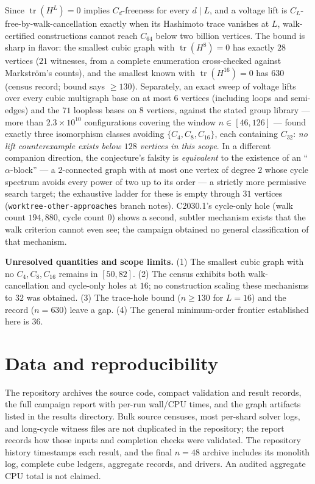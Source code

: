 \documentclass[11pt]{article}
\theoremstyle{remark}
\newcommand{\Cyc}[1]{C_{#1}}
\begin{document}
Since $\operatorname{tr}(H^L) = 0$ implies $\Cyc d$-freeness for every
$d \mid L$, and a voltage lift is $\Cyc L$-free-by-walk-cancellation exactly
when its Hashimoto trace vanishes at $L$, walk-certified constructions
cannot reach $\Cyc{64}$ below two billion vertices. The bound is sharp in
flavor: the smallest cubic graph with $\operatorname{tr}(H^8)=0$ has exactly
$28$ vertices ($21$ witnesses, from a complete enumeration cross-checked
against Markstr\"om's counts), and the smallest known with
$\operatorname{tr}(H^{16})=0$ has $630$ (census record; bound says
$\ge 130$). Separately, an exact sweep of voltage lifts over every cubic
multigraph base on at most $6$ vertices (including loops and semi-edges) and
the $71$ loopless bases on $8$ vertices, against the stated group library ---
more than $2.3\times10^{10}$ configurations covering the window
$n \in [46,126]$ ---
found exactly three isomorphism classes avoiding
$\{\Cyc4,\Cyc8,\Cyc{16}\}$, each containing $\Cyc{32}$: \emph{no lift
counterexample exists below $128$ vertices in this scope}. In a different
companion direction, the conjecture's falsity is \emph{equivalent} to the
existence of an ``$\alpha$-block'' --- a $2$-connected graph with at most
one vertex of degree $2$ whose cycle spectrum avoids every power of two up
to its order --- a strictly more permissive search target; the exhaustive
ladder for these is empty through $31$ vertices
(\texttt{worktree-other-approaches} branch notes). C2030.1's cycle-only hole (walk count
$194{,}880$, cycle count $0$) shows a second, subtler mechanism exists
that the walk criterion cannot even see; the campaign obtained no general
classification of that mechanism.

\textbf{Unresolved quantities and scope limits.}
(1) The smallest cubic graph with no $\Cyc4,\Cyc8,\Cyc{16}$ remains in
$[50,82]$.
(2) The census exhibits both walk-cancellation and cycle-only holes at $16$;
no construction scaling these mechanisms to $32$ was obtained.
(3) The trace-hole bound ($n \ge 130$ for $L=16$) and the record
($n = 630$) leave a gap.
(4) The general minimum-order frontier established here is $36$.

\section{Data and reproducibility}
\label{sec:data}

The repository archives the source code, compact validation and result
records, the full campaign report with per-run wall/CPU times, and the graph
artifacts listed in the results directory. Bulk source censuses, most
per-shard solver logs, and long-cycle witness files are not duplicated in the
repository; the report records how those inputs and completion checks were
validated. The repository history timestamps each result, and the final
$n=48$ archive includes its monolith log, complete cube ledgers, aggregate
records, and drivers. An audited aggregate CPU total is not claimed.
\end{document}
